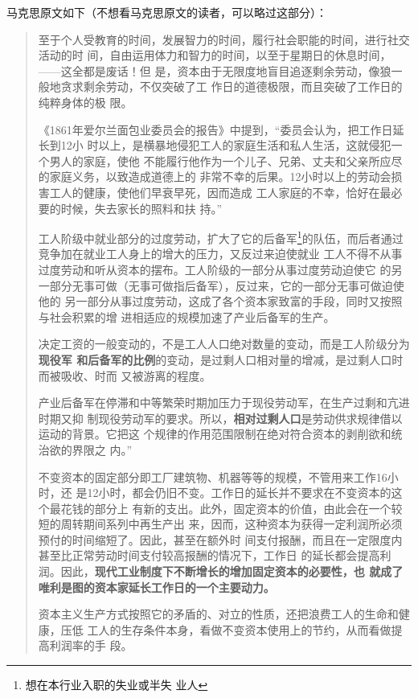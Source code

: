 马克思原文如下（不想看马克思原文的读者，可以略过这部分）：
\begin{quotation}
  至于个人受教育的时间，发展智力的时间，履行社会职能的时间，进行社交活动的时
  间，自由运用体力和智力的时间，以至于星期日的休息时间，——这全都是废话！但
  是，资本由于无限度地盲目追逐剩余劳动，像狼一般地贪求剩余劳动，不仅突破了工
  作日的道德极限，而且突破了工作日的纯粹身体的极
  限。\cite[306]{capital}

  《1861年爱尔兰面包业委员会的报告》中提到，“委员会认为，把工作日延长到12小
  时以上，是横暴地侵犯工人的家庭生活和私人生活，这就侵犯一个男人的家庭，使他
  不能履行他作为一个儿子、兄弟、丈夫和父亲所应尽的家庭义务，以致造成道德上的
  非常不幸的后果。12小时以上的劳动会损害工人的健康，使他们早衰早死，因而造成
  工人家庭的不幸，恰好在最必要的时候，失去家长的照料和扶
  持。”\cite[292]{capital}

  工人阶级中就业部分的过度劳动，扩大了它的后备军\footnote{想在本行业入职的失业或半失
    业人}的队伍，而后者通过竞争加在就业工人身上的增大的压力，又反过来迫使就业
  工人不得不从事过度劳动和听从资本的摆布。工人阶级的一部分从事过度劳动迫使它
  的另一部分无事可做（无事可做指后备军），反过来，它的一部分无事可做迫使他的
  另一部分从事过度劳动，这成了各个资本家致富的手段，同时又按照与社会积累的增
  进相适应的规模加速了产业后备军的生产。\cite[733]{capital}

  决定工资的一般变动的，不是工人人口绝对数量的变动，而是工人阶级分为\textbf{现役军
    和后备军的比例}的变动，是过剩人口相对量的增减，是过剩人口时而被吸收、时而
  又被游离的程度。\cite[733]{capital}

  产业后备军在停滞和中等繁荣时期加压力于现役劳动军，在生产过剩和亢进时期又抑
  制现役劳动军的要求。所以，\textbf{相对过剩人口}是劳动供求规律借以运动的背景。它把这
  个规律的作用范围限制在绝对符合资本的剥削欲和统治欲的界限之
  内。”\cite[736]{capital}

  不变资本的固定部分即工厂建筑物、机器等等的规模，不管用来工作16小时，还
  是12小时，都会仍旧不变。工作日的延长并不要求在不变资本的这个最花钱的部分上
  有新的支出。此外，固定资本的价值，由此会在一个较短的周转期间系列中再生产出
  来，因而，这种资本为获得一定利润所必须预付的时间缩短了。因此，甚至在额外时
  间支付报酬，而且在一定限度内甚至比正常劳动时间支付较高报酬的情况下，工作日
  的延长都会提高利润。因此，\textbf{现代工业制度下不断增长的增加固定资本的必要性，也
  就成了唯利是图的资本家延长工作日的一个主要动力。}\cite[91]{capital3}

  资本主义生产方式按照它的矛盾的、对立的性质，还把浪费工人的生命和健康，压低
  工人的生存条件本身，看做不变资本使用上的节约，从而看做提高利润率的手
  段。\cite[101]{capital3}
\end{quotation}

